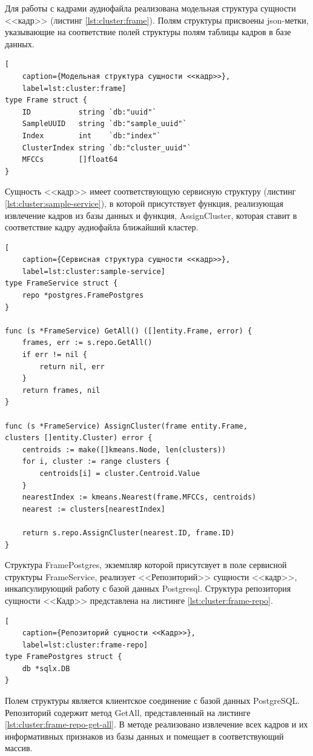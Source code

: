 Для работы с кадрами аудиофайла реализована модельная структура сущности <<кадр>> (листинг  \ref{lst:cluster:frame}). Полям структуры присвоены json-метки, указывающие на соответствие полей структуры полям таблицы кадров в базе данных.
\begin{lstlisting}[
	caption={Модельная структура сущности <<кадр>>},
	label=lst:cluster:frame]
type Frame struct {
	ID           string `db:"uuid"`
	SampleUUID   string `db:"sample_uuid"`
	Index        int    `db:"index"`
	ClusterIndex string `db:"cluster_uuid"`
	MFCCs        []float64
}
\end{lstlisting}
Сущность <<кадр>> имеет соответствующую сервисную структуру (листинг \ref{lst:cluster:sample-service}), в которой присутствует функция, реализующая извлечение кадров из базы данных и функция, AssignCluster, которая ставит в соответствие кадру аудиофайла ближайший кластер.
\begin{lstlisting}[
	caption={Сервисная структура сущности <<кадр>>},
	label=lst:cluster:sample-service]
type FrameService struct {
	repo *postgres.FramePostgres
}

func (s *FrameService) GetAll() ([]entity.Frame, error) {
	frames, err := s.repo.GetAll()
	if err != nil {
		return nil, err
	}
	return frames, nil
}

func (s *FrameService) AssignCluster(frame entity.Frame, 
clusters []entity.Cluster) error {
	centroids := make([]kmeans.Node, len(clusters))
	for i, cluster := range clusters {
		centroids[i] = cluster.Centroid.Value
	}
	nearestIndex := kmeans.Nearest(frame.MFCCs, centroids)
	nearest := clusters[nearestIndex]
	
	return s.repo.AssignCluster(nearest.ID, frame.ID)
}
\end{lstlisting}
Структура FramePostgres, экземпляр которой присутсвует в поле сервисной структуры FrameService, реализует <<Репозиторий>> сущности <<кадр>>,  инкапсулирующий работу с базой данных Postgresql. Структура репозитория сущности <<Кадр>> представлена на листинге \ref{lst:cluster:frame-repo}.
\begin{lstlisting}[
	caption={Репозиторий сущности <<Кадр>>},
	label=lst:cluster:frame-repo]
type FramePostgres struct {
	db *sqlx.DB
}
\end{lstlisting}
Полем структуры является клиентское соединение с базой данных PostgreSQL. Репозиторий содержит метод GetAll, представленный на листинге \ref{lst:cluster:frame-repo-get-all}. В методе реализовано извлечение всех кадров и их информативных признаков из базы данных и помещает в соответствующий массив.
